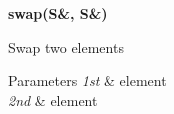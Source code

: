 {\bfseries swap(\-S\&, S\&)}\par
Swap two elements 
\begin{DoxyParams}{Parameters}
{\em 1st} & element \\
\hline
{\em 2nd} & element \\
\hline
\end{DoxyParams}
